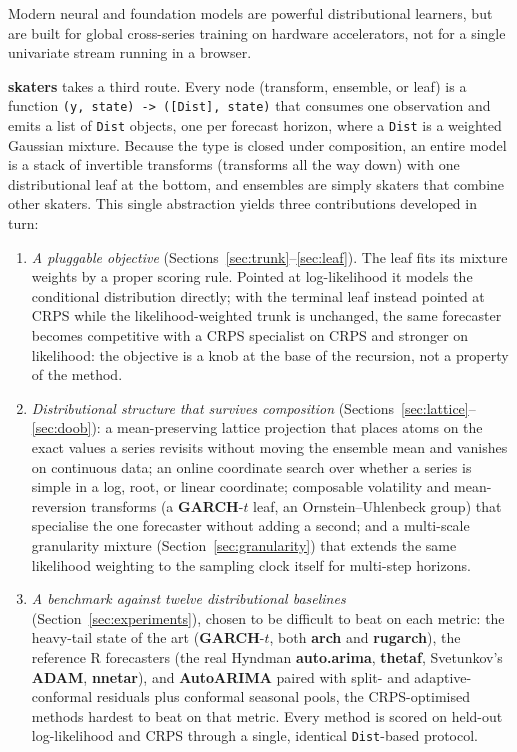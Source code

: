 \documentclass[article]{jss}
\providecommand{\proglang}[1]{\textsf{#1}}
\providecommand{\pkg}[1]{\textbf{#1}}
\providecommand{\code}[1]{\texttt{#1}}
\begin{document}
Modern neural and foundation models
\citep{salinas2020deepar,ansari2024chronos,das2024timesfm,woo2024moirai} are
powerful distributional learners, but are built for global cross-series training
on hardware accelerators, not for a single univariate stream running in a
browser.

\pkg{skaters} takes a third route. Every node (transform, ensemble, or leaf)
is a function \code{(y, state) -> ([Dist], state)} that consumes one
observation and emits a list of \code{Dist} objects, one per forecast horizon,
where a \code{Dist} is a weighted Gaussian mixture. Because the type is closed
under composition, an entire model is a stack of invertible transforms
(transforms all the way down) with one distributional leaf at the bottom, and
ensembles are simply skaters that combine other skaters. This single abstraction
yields three contributions developed in turn:

\begin{enumerate}
\item \emph{A pluggable objective} (Sections~\ref{sec:trunk}--\ref{sec:leaf}).
  The leaf fits its mixture weights by a proper scoring rule. Pointed at
  log-likelihood it models the conditional distribution directly; with the
  terminal leaf instead pointed at CRPS while the likelihood-weighted trunk is
  unchanged, the same forecaster becomes competitive with a CRPS specialist on
  CRPS and stronger on likelihood: the objective is a knob at the base of the
  recursion, not a property of the method.
\item \emph{Distributional structure that survives composition}
  (Sections~\ref{sec:lattice}--\ref{sec:doob}): a mean-preserving lattice
  projection that places atoms on the exact values a series revisits without
  moving the ensemble mean and vanishes on continuous data; an online coordinate
  search over whether a series is simple in a log, root, or linear coordinate;
  composable volatility and mean-reversion transforms (a \pkg{GARCH}-$t$ leaf, an
  Ornstein--Uhlenbeck group) that specialise the one forecaster without adding a
  second; and a multi-scale granularity mixture (Section~\ref{sec:granularity})
  that extends the same likelihood weighting to the sampling clock itself for
  multi-step horizons.
\item \emph{A benchmark against twelve distributional baselines}
  (Section~\ref{sec:experiments}), chosen to be difficult to beat on each
  metric:
  the heavy-tail state of the art (\pkg{GARCH}-$t$, both \pkg{arch} and
  \pkg{rugarch}), the reference \proglang{R} forecasters (the real Hyndman
  \pkg{auto.arima}, \pkg{thetaf}, Svetunkov's \pkg{ADAM}, \pkg{nnetar}), and
  \pkg{AutoARIMA} paired with split- and adaptive-conformal residuals plus
  conformal seasonal pools, the CRPS-optimised methods hardest to beat on that
  metric. Every method is scored on held-out log-likelihood and CRPS through a
  single, identical \code{Dist}-based protocol.
\end{enumerate}
\end{document}
